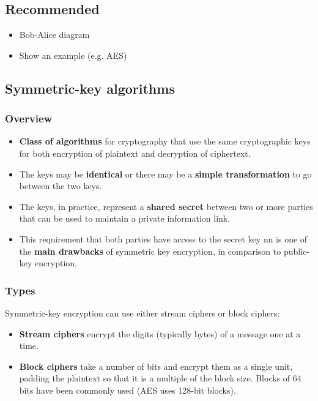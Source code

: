 
\subsection{Recommended}
\begin{itemize}
\item Bob-Alice diagram
\item Show an example (e.g. AES)
\end{itemize}

\subsection{Symmetric-key algorithms}

\subsubsection{Overview}
\begin{itemize}
\item \textbf{Class of algorithms} for cryptography that use the same
  cryptographic keys for both encryption of plaintext and decryption
  of ciphertext.
\item The keys may be \textbf{identical} or there may be a \textbf{simple
  transformation} to go between the two keys.
\item The keys, in practice, represent a \textbf{shared secret} between two or
  more parties that can be used to maintain a private information
  link.
\item This requirement that both parties have access to the secret key
nn  is one of the \textbf{main drawbacks} of symmetric key encryption, in
  comparison to public-key encryption.
\end{itemize}

\subsubsection{Types}
Symmetric-key encryption can use either stream ciphers or block ciphers:
\begin{itemize}
\item \textbf{Stream ciphers} encrypt the digits (typically bytes) of a
  message one at a time.
\item \textbf{Block ciphers} take a number of bits and encrypt them as a
  single unit, padding the plaintext so that it is a multiple of the
  block size. Blocks of 64 bits have been commonly used (AES uses
  128-bit blocks).
\end{itemize}

